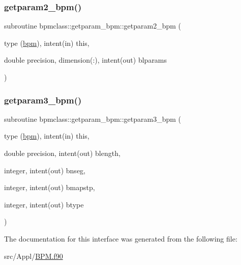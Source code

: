 \mbox{\label{interfacebpmclass_1_1getparam__bpm_a6a43932c91f8e19916dc2b5509386030}} 
\subsubsection{\texorpdfstring{getparam2\_bpm()}{getparam2\_bpm()}}
{\footnotesize\ttfamily subroutine bpmclass\+::getparam\+\_\+bpm\+::getparam2\+\_\+bpm (\begin{DoxyParamCaption}\item[{type (\mbox{\hyperlink{namespacebpmclass_structbpmclass_1_1bpm}{bpm}}), intent(in)}]{this,  }\item[{double precision, dimension(\+:), intent(out)}]{blparams }\end{DoxyParamCaption})}

\mbox{\label{interfacebpmclass_1_1getparam__bpm_afd95f0479ea8dd53ec2fecfa282b42da}} 
\subsubsection{\texorpdfstring{getparam3\_bpm()}{getparam3\_bpm()}}
{\footnotesize\ttfamily subroutine bpmclass\+::getparam\+\_\+bpm\+::getparam3\+\_\+bpm (\begin{DoxyParamCaption}\item[{type (\mbox{\hyperlink{namespacebpmclass_structbpmclass_1_1bpm}{bpm}}), intent(in)}]{this,  }\item[{double precision, intent(out)}]{blength,  }\item[{integer, intent(out)}]{bnseg,  }\item[{integer, intent(out)}]{bmapstp,  }\item[{integer, intent(out)}]{btype }\end{DoxyParamCaption})}



The documentation for this interface was generated from the following file\+:\begin{DoxyCompactItemize}
\item 
src/\+Appl/\mbox{\hyperlink{_b_p_m_8f90}{B\+P\+M.\+f90}}\end{DoxyCompactItemize}
